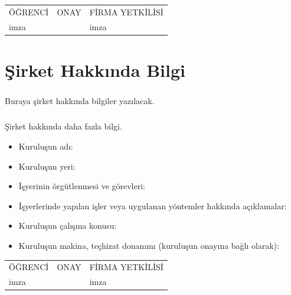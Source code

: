 \documentclass[12pt,a4paper]{report}
\begin{document}
  


\tableofcontents

\mbox{}
\vfill
\begin{center}
\begin{tabular}{|>{\centering}m{3.6cm}|>{\centering}m{7.4cm}|>{\centering}m{4cm}|}
ÖĞRENCİ&ONAY&FİRMA YETKİLİSİ
\tabularnewline
imza &&imza
\end{tabular}
\end{center}

\newpage
\chapter*{Şirket Hakkında Bilgi}

\paragraph{} Buraya şirket hakkında bilgiler yazılacak.
\paragraph{} Şirket hakkında daha fazla bilgi.

\begin{itemize}
\item Kuruluşun adı:
\item Kuruluşun yeri:
\item İşyerinin örgütlenmesi ve görevleri:
\item İşyerlerinde yapılan işler veya uygulanan yöntemler hakkında açıklamalar:
\item Kuruluşun çalışma konusu:
\item Kuruluşun makina, teçhizat donanımı (kuruluşun onayına bağlı olarak):
\end{itemize}
\mbox{}
\vfill
\begin{center}
\begin{tabular}{|>{\centering}m{3.6cm}|>{\centering}m{7.4cm}|>{\centering}m{4cm}|}
ÖĞRENCİ&ONAY&FİRMA YETKİLİSİ
\tabularnewline
imza &&imza
\end{tabular}
\end{center}
\end{document}

